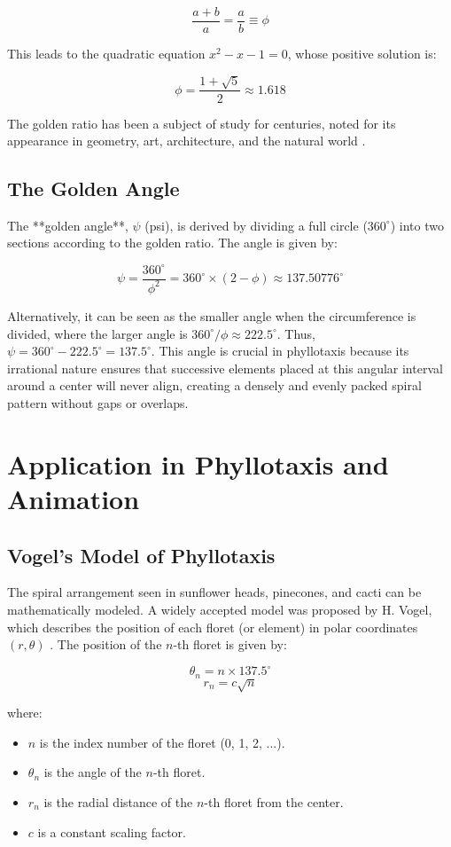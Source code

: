 \documentclass[12pt, a4paper]{article}
\begin{document}
$$
\frac{a+b}{a} = \frac{a}{b} \equiv \phi
$$

This leads to the quadratic equation $x^2 - x - 1 = 0$, whose positive solution is:

$$
\phi = \frac{1 + \sqrt{5}}{2} \approx 1.618
$$

The golden ratio has been a subject of study for centuries, noted for its appearance in geometry, art, architecture, and the natural world \cite{Livio2003}.

\subsection{The Golden Angle}

The **golden angle**, $\psi$ (psi), is derived by dividing a full circle ($360^\circ$) into two sections according to the golden ratio. The angle is given by:

$$
\psi = \frac{360^\circ}{\phi^2} = 360^\circ \times (2 - \phi) \approx 137.50776^\circ
$$

Alternatively, it can be seen as the smaller angle when the circumference is divided, where the larger angle is $360^\circ / \phi \approx 222.5^\circ$. Thus, $\psi = 360^\circ - 222.5^\circ = 137.5^\circ$. This angle is crucial in phyllotaxis because its irrational nature ensures that successive elements placed at this angular interval around a center will never align, creating a densely and evenly packed spiral pattern without gaps or overlaps.

\section{Application in Phyllotaxis and Animation}

\subsection{Vogel's Model of Phyllotaxis}

The spiral arrangement seen in sunflower heads, pinecones, and cacti can be mathematically modeled. A widely accepted model was proposed by H. Vogel, which describes the position of each floret (or element) in polar coordinates $(r, \theta)$ \cite{Vogel1979}. The position of the $n$-th floret is given by:

$$
\theta_n = n \times 137.5^\circ
$$
$$
r_n = c \sqrt{n}
$$

where:
\begin{itemize}
    \item $n$ is the index number of the floret (0, 1, 2, ...).
    \item $\theta_n$ is the angle of the $n$-th floret.
    \item $r_n$ is the radial distance of the $n$-th floret from the center.
    \item $c$ is a constant scaling factor.
\end{itemize}
\end{document}
